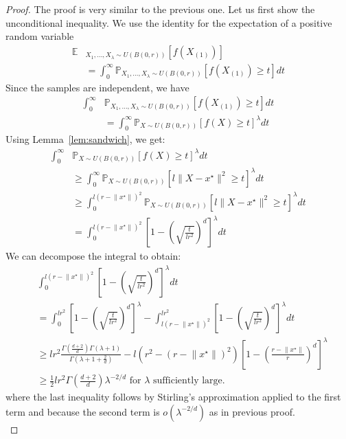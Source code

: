 \begin{proof}
The proof is very similar to the previous one. Let us first show the unconditional inequality. We use the identity for the expectation of a positive random variable
\begin{align*}
\mathbb{E}&_{X_1,\dots,X_\lambda\sim  U(B(0,r))}\left[ f\left(X_{(1)}\right)\right] \\
&= \int_0^\infty \mathbb{P}_{X_1,\dots,X_\lambda\sim  U(B(0,r))}\left[ f\left(X_{(1)}\right)\geq t\right] dt
\end{align*}
Since the samples are independent, we have
\begin{align*}
 \int_0^\infty &\mathbb{P}_{X_1,\dots,X_\lambda\sim U(B(0,r))}\left[ f\left(X_{(1)}\right)\geq t \right] dt\\ 
 & = \int_0^\infty \mathbb{P}_{X\sim  U(B(0,r))}\left[ f\left(X\right)\geq t\right]^\lambda dt
 \end{align*}
 Using Lemma~\ref{lem:sandwich}, we get:
 \begin{align*}
 \int_0^\infty& \mathbb{P}_{X\sim U(B(0,r))}\left[ f\left(X\right)\geq t\right]^\lambda dt\\
& \geq \int_0^\infty \mathbb{P}_{X\sim  U(B(0,r))}\left[ l\lVert X-x^\star\rVert^2 \geq t\right]^\lambda dt\\
& \geq \int_0^{l(r-\lVert x^\star\rVert)^2} \mathbb{P}_{X\sim U(B(0,r))}\left[ l\lVert X-x^\star\rVert^2 \geq t\right]^\lambda dt\\
&=\int_0^{l(r-\lVert x^\star\rVert)^2} \left[ 1-\left(\sqrt{\frac{t}{lr^2}}\right)^d\right]^\lambda dt
\end{align*}
We can decompose the integral to obtain:
\begin{align*}
    &\int_0^{l(r-\lVert x^\star\rVert)^2} \left[ 1-\left(\sqrt{\frac{t}{lr^2}}\right)^d\right]^\lambda dt\\
    &=\int_0^{lr^2} \left[ 1-\left(\sqrt{\frac{t}{lr^2}}\right)^d\right]^\lambda - \int_{l(r-\lVert x^\star\rVert)^2}^{lr^2} \left[ 1-\left(\sqrt{\frac{t}{lr^2}}\right)^d\right]^\lambda dt\\
    &\geq lr^2\frac{\Gamma(\frac{d+2}{d})\Gamma(\lambda+1)}{\Gamma(\lambda+1+\frac2d)}- l(r^2-(r-\lVert x^\star\rVert)^2)\left[ 1-\left(\frac{r-\lVert x^\star\rVert}{r}\right)^{d}\right]^\lambda\\
    &\geq \frac12 lr^2 \Gamma(\frac{d+2}{d}) \lambda^{-2/d}\text{ for $\lambda$ sufficiently large.}
\end{align*}
where the last inequality follows by Stirling's approximation applied to the first term and because the second term is $o(\lambda^{-2/d})$ as in previous proof.\\

\end{proof}
